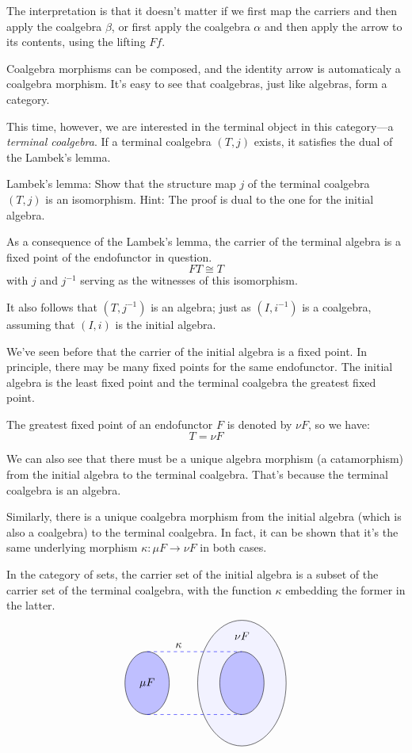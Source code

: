 \documentclass[DaoFP]{subfiles}
\begin{document}
The interpretation is that it doesn't matter if we first map the carriers and then apply the coalgebra $\beta$, or first apply the coalgebra $\alpha$ and then apply the arrow to its contents, using the lifting $F f$.

Coalgebra morphisms can be composed, and the identity arrow is automaticaly a coalgebra morphism. It's easy to see that coalgebras, just like algebras, form a category. 

This time, however, we are interested in the terminal object in this category---a \emph{terminal coalgebra}. If a terminal coalgebra $(T, j)$ exists, it satisfies the dual of the Lambek's lemma. 

\begin{exercise}{Lambek's lemma:}
Show that the structure map $j$ of the terminal coalgebra $(T, j)$ is an isomorphism. Hint: The proof is dual to the one for the initial algebra.
\end{exercise}

As a consequence of the Lambek's lemma, the carrier of the terminal algebra is a fixed point of the endofunctor in question. 
\[ F T \cong T \]
with $j$ and $j^{-1}$ serving as the witnesses of this isomorphism. 

It also follows that $(T, j^{-1})$ is an algebra; just as  $(I, i^{-1})$ is a coalgebra, assuming that $(I, i)$ is the initial algebra.

We've seen before that the carrier of the initial algebra is a fixed point. In principle, there may be many fixed points for the same endofunctor. The initial algebra is the least fixed point and the terminal coalgebra the greatest fixed point. 

The greatest fixed point of an endofunctor $F$ is denoted by $\nu F$, so we have:
\[ T = \nu F \]

We can also see that there must be a unique algebra morphism (a catamorphism) from the initial algebra to the terminal coalgebra. That's because the terminal coalgebra is an algebra. 

Similarly, there is a unique coalgebra morphism from the initial algebra (which is also a coalgebra) to the terminal coalgebra. In fact, it can be shown that it's the same underlying morphism $\kappa \colon \mu F \to \nu F$ in both cases. 

In the category of sets, the carrier set of the initial algebra is a subset of the carrier set of the terminal coalgebra, with the function $\kappa$ embedding the former in the latter. 
\[
\begin{tikzpicture}
         \draw (-1,0)[fill=blue!25!white] ellipse (0.7 and 1);
         \draw (2,0)[fill=blue!5!white] ellipse (1.4 and 2);
         \draw (2,0)[fill=blue!25!white] ellipse (0.7 and 1);
         \node[above] at (0, 1) {$\kappa$};
       	\draw[dashed, blue] (-1, 1) -- (2, 1);
	\draw[dashed, blue] (-1, -1) -- (2, -1);
        \node at (-1, 0) { $\mu F$ };
        \node at (2, 1.5) { $\nu F$ };
\end{tikzpicture}
\]
\end{document}

